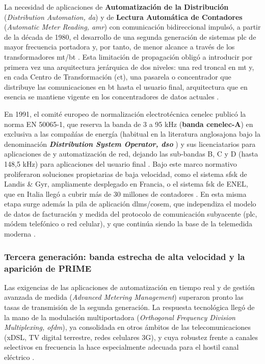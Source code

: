 La necesidad de aplicaciones de \textbf{Automatización de la Distribución} (\textit{Distribution Automation, \gls{da}}) y de \textbf{Lectura Automática de Contadores} (\textit{Automatic Meter Reading, \gls{amr}}) con comunicación bidireccional impulsó, a partir de la década de 1980, el desarrollo de una segunda generación de sistemas \gls{plc} de mayor frecuencia portadora y, por tanto, de menor alcance a través de los transformadores \gls{mt}/\gls{bt} \cite{5764444}. Esta limitación de propagación obligó a introducir por primera vez una arquitectura jerárquica de dos niveles: una red troncal en \gls{mt} y, en cada Centro de Transformación (\gls{ct}), una pasarela o concentrador que distribuye las comunicaciones en \gls{bt} hasta el usuario final, arquitectura que en esencia se mantiene vigente en los concentradores de datos actuales \cite{5764444}.

En 1991, el comité europeo de normalización electrotécnica \gls{cenelec} publicó la norma EN 50065-1, que reserva la banda de 3 a 95 kHz (\textbf{banda \gls{cenelec}-A}) en exclusiva a las compañías  de energía (habitual en la literatura anglosajona bajo la denominación \textbf{\textit{Distribution System Operator, \gls{dso}}} \cite{5764443}) y sus licenciatarios para aplicaciones de  y automatización de red, dejando las sub-bandas B, C y D (hasta 148,5 kHz) para aplicaciones del usuario final \cite{EN50065_1, 5764444}. Bajo este marco normativo proliferaron soluciones propietarias de baja velocidad, como el sistema \gls{sfsk} de Landis \& Gyr, ampliamente desplegado en Francia, o el sistema \gls{fsk} de ENEL, que en Italia llegó a cubrir más de 30 millones de contadores \cite{5764444}. En esta misma etapa surge además la pila de aplicación \gls{dlms}/\gls{cosem}, que independiza el modelo de datos de facturación y medida del protocolo de comunicación subyacente (\gls{plc}, módem telefónico o red celular), y que continúa siendo la base de la telemedida moderna \cite{5764444}.

\subsubsection{Tercera generación: banda estrecha de alta velocidad y la aparición de PRIME}
\label{subsubsec:tercera_generacion_ofdm}

Las exigencias de las aplicaciones de automatización en tiempo real y de gestión avanzada de medida (\textit{Advanced Metering Management}) superaron pronto las tasas de transmisión de la segunda generación. La respuesta tecnológica llegó de la mano de la modulación multiportadora (\textit{Orthogonal Frequency Division Multiplexing, \gls{ofdm}}), ya consolidada en otros ámbitos de las telecomunicaciones (xDSL, TV digital terrestre, redes celulares 3G), y cuya robustez frente a canales selectivos en frecuencia la hace especialmente adecuada para el hostil canal eléctrico \cite{5764444}.

